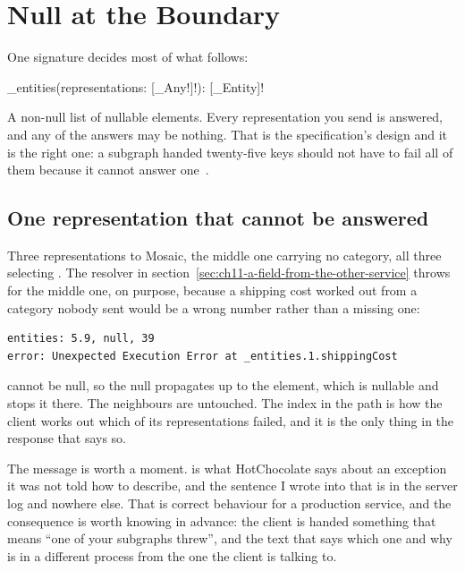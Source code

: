 \section{Null at the Boundary}
\label{sec:ch11-null-at-the-boundary}
%

One signature decides most of what follows:

\begin{graphqlsdl}[fontsize=\footnotesize]
_entities(representations: [_Any!]!): [_Entity]!
\end{graphqlsdl}

A non-null list of nullable elements. Every representation you send is
answered, and any of the answers may be nothing. That is the specification's
design and it is the right one: a subgraph handed twenty-five keys should not
have to fail all of them because it cannot answer
one~\autocite{apollo2026subgraphspec}.

\subsection*{One representation that cannot be answered}

%
Three representations to Mosaic, the middle one carrying no category, all three
selecting . The resolver in
section~\ref{sec:ch11-a-field-from-the-other-service} throws for the middle
one, on purpose, because a shipping cost worked out from a category nobody sent
would be a wrong number rather than a missing one:

\begin{verbatim}
entities: 5.9, null, 39
error: Unexpected Execution Error at _entities.1.shippingCost
\end{verbatim}

 cannot be null, so the null propagates up to the 
element, which is nullable and stops it there. The neighbours are untouched.
The index in the path is how the client works out which of its representations
failed, and it is the only thing in the response that says so.

%
The message is worth a moment.  is what
HotChocolate says about an exception it was not told how to describe, and the
sentence I wrote into that  is in the server
log and nowhere else. That is correct behaviour for a production service, and
the consequence is worth knowing in advance: the client is handed something
that means \enquote{one of your subgraphs threw}, and the text that says which
one and why is in a different process from the one the client is talking to.

